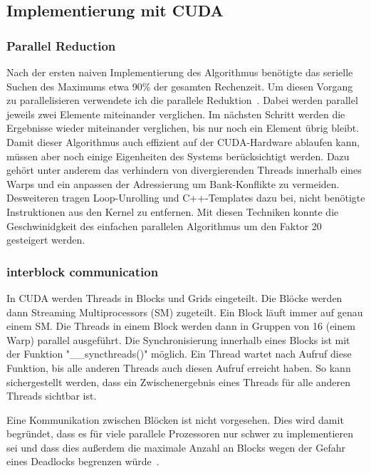 \documentclass{scrartcl}
\begin{document}
\subsection{Implementierung mit CUDA}
\subsubsection{Parallel Reduction}
Nach der ersten naiven Implementierung des Algorithmus benötigte das serielle Suchen des Maximums etwa 90\% der gesamten Rechenzeit. %
Um diesen Vorgang zu parallelisieren verwendete ich die parallele Reduktion~\cite{parallelreduction}.
Dabei werden parallel jeweils zwei Elemente miteinander verglichen.
Im nächsten Schritt werden die Ergebnisse wieder miteinander verglichen, bis nur noch ein Element übrig bleibt.
Damit dieser Algorithmus auch effizient auf der CUDA-Hardware ablaufen kann, müssen aber noch einige Eigenheiten des Systems berücksichtigt werden.
Dazu gehört unter anderem das verhindern von divergierenden Threads innerhalb eines Warps und ein anpassen der Adressierung um Bank-Konflikte zu vermeiden.
Desweiteren tragen Loop-Unrolling und C++-Templates dazu bei, nicht benötigte Instruktionen aus den Kernel zu entfernen.
Mit diesen Techniken konnte die Geschwinidgkeit des einfachen parallelen Algorithmus um den Faktor 20 gesteigert werden.
\subsubsection{interblock communication}
In CUDA werden Threads in Blocks und Grids eingeteilt.
Die Blöcke werden dann Streaming Multiprocessors (SM) zugeteilt.
Ein Block läuft immer auf genau einem SM.
Die Threads in einem Block werden dann in Gruppen von 16 (einem Warp) parallel ausgeführt.
Die Synchronisierung innerhalb eines Blocks ist mit der Funktion "\_\_syncthreads()" möglich.
Ein Thread wartet nach Aufruf diese Funktion, bis alle anderen Threads auch diesen Aufruf erreicht haben.
So kann sichergestellt werden, dass ein Zwischenergebnis eines Threads für alle anderen Threads sichtbar ist.

Eine Kommunikation zwischen Blöcken ist nicht vorgesehen.
Dies wird damit begründet, dass es für viele parallele Prozessoren nur schwer zu implementieren sei und dass dies außerdem die maximale Anzahl an Blocks wegen der Gefahr eines Deadlocks begrenzen würde~\cite{parallelreduction}.
\end{document}
